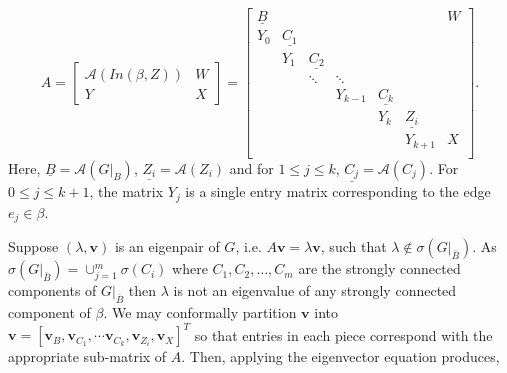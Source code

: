 \documentclass{paper}
\begin{document}
\[
A = 
\begin{bmatrix}
\mathcal{A}(In(\beta,Z)) & W \\
Y & X
\end{bmatrix}
=
\begin{bmatrix}
\underline{B} & & & & & & W\\
Y_0 & \underline{C_1} \\
    & Y_1 	& \underline{C_2} \\
    &     	& \ddots 	& \ddots \\
    &  	  	&		 	&	Y_{k-1} 	& \underline{C_k}\\

  &  &  	  	&		 	&	Y_k 	& \underline{Z_i}\\
  &  &		&			&		& Y_{k+1} & X \\
\end{bmatrix}.
\]
Here, $\underline{B} = \mathcal{A}(G|_B)$, $\underline{Z_i} = \mathcal{A}(Z_i)$ and for $1 \leq j \leq k$, $\underline{C_j} = \mathcal{A}(C_j)$. For $0 \leq j \leq k+1$, the matrix $Y_j$ is a single entry matrix corresponding to the edge $e_j \in \beta$. 

Suppose $(\lambda, \mathbf{v})$ is an eigenpair of $G$, i.e. $A\mathbf{v}=\lambda\mathbf{v}$, such that $\lambda\notin\sigma(G|_{\bar{B}})$. 
As $ \sigma(G|_{\bar{B}}) = \cup_{j=1}^m \sigma(C_i)$ where $C_1,C_2,\dots,C_m$ 
are the strongly connected components of $G|_{\bar{B}}$ then $\lambda$ is not an eigenvalue of any strongly connected component of $\beta$. 
We may conformally partition $\mathbf{v}$ into $\mathbf{v} = [\mathbf{v}_B, \mathbf{v}_{C_1}, \cdots \mathbf{v}_{C_k}, \mathbf{v}_{{Z_{i}}}, \mathbf{v}_{X}]^{T}$ so that entries in each piece correspond with the appropriate sub-matrix of $A$. Then, applying the eigenvector equation produces,
\end{document}
